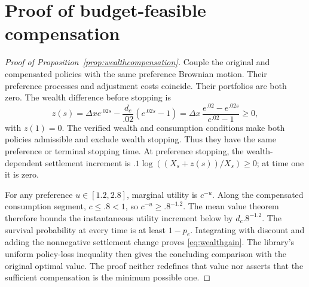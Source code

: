 \section{Proof of budget-feasible compensation}\label{app:wealthproof}
\begin{proof}[Proof of Proposition~\ref{prop:wealthcompensation}]
Couple the original and compensated policies with the same preference Brownian motion. Their preference processes and adjustment costs coincide. Their portfolios are both zero. The wealth difference before stopping is
\[
 z(s)=\Delta x e^{.02s}-\frac{d_c}{.02}(e^{.02s}-1)
 =\Delta x\,\frac{e^{.02}-e^{.02s}}{e^{.02}-1}\geq0,
\]
with $z(1)=0$. The verified wealth and consumption conditions make both policies admissible and exclude wealth stopping. Thus they have the same preference or terminal stopping time. At preference stopping, the wealth-dependent settlement increment is $.1\log((X_s+z(s))/X_s)\geq0$; at time one it is zero.

For any preference $u\in[1.2,2.8]$, marginal utility is $c^{-u}$. Along the compensated consumption segment, $c\leq.8<1$, so $c^{-u}\geq.8^{-1.2}$. The mean value theorem therefore bounds the instantaneous utility increment below by $d_c .8^{-1.2}$. The survival probability at every time is at least $1-p_e$. Integrating with discount and adding the nonnegative settlement change proves \eqref{eq:wealthgain}. The library's uniform policy-loss inequality then gives the concluding comparison with the original optimal value. The proof neither redefines that value nor asserts that the sufficient compensation is the minimum possible one.
\end{proof}
